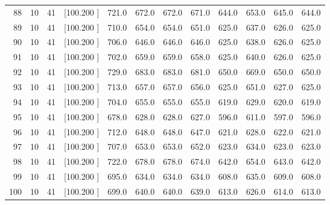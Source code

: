 \documentclass[12pt,a4paper]{article}
\begin{document}
\begin{center}
{\begin{tabular}{r r r r r r r r r r r r}
  88& 10& 41&[100.200   ]&   721.0&   672.0&   672.0&   671.0&   644.0&   653.0&   645.0&   644.0\\[-0.02in]
  89& 10& 41&[100.200   ]&   710.0&   654.0&   654.0&   651.0&   625.0&   637.0&   626.0&   625.0\\[-0.02in]
  90& 10& 41&[100.200   ]&   706.0&   646.0&   646.0&   646.0&   625.0&   638.0&   626.0&   625.0\\[-0.02in]
  91& 10& 41&[100.200   ]&   702.0&   659.0&   659.0&   658.0&   625.0&   640.0&   626.0&   625.0\\[-0.02in]
  92& 10& 41&[100.200   ]&   729.0&   683.0&   683.0&   681.0&   650.0&   669.0&   650.0&   650.0\\[-0.02in]
  93& 10& 41&[100.200   ]&   713.0&   657.0&   657.0&   656.0&   625.0&   651.0&   627.0&   625.0\\[-0.02in]
  94& 10& 41&[100.200   ]&   704.0&   655.0&   655.0&   655.0&   619.0&   629.0&   620.0&   619.0\\[-0.02in]
  95& 10& 41&[100.200   ]&   678.0&   628.0&   628.0&   627.0&   596.0&   611.0&   597.0&   596.0\\[-0.02in]
  96& 10& 41&[100.200   ]&   712.0&   648.0&   648.0&   647.0&   621.0&   628.0&   622.0&   621.0\\[-0.02in]
  97& 10& 41&[100.200   ]&   707.0&   653.0&   653.0&   652.0&   623.0&   634.0&   623.0&   623.0\\[-0.02in]
  98& 10& 41&[100.200   ]&   722.0&   678.0&   678.0&   674.0&   642.0&   654.0&   643.0&   642.0\\[-0.02in]
  99& 10& 41&[100.200   ]&   695.0&   634.0&   634.0&   634.0&   608.0&   635.0&   609.0&   608.0\\[-0.02in]
 100& 10& 41&[100.200   ]&   699.0&   640.0&   640.0&   639.0&   613.0&   626.0&   614.0&   613.0\\[-0.02in]

\hline
\end{tabular}}
\end{center}
\end{document}
